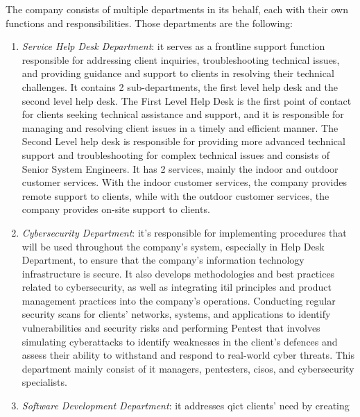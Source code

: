 \begin{multicols}{2}
      The company consists of multiple departments in its behalf, each with their own functions and responsibilities.
      Those departments are the following:
      \begin{enumerate}
            \item \textit{Service Help Desk Department}: it serves as a frontline support function responsible for
                  addressing client inquiries, troubleshooting technical issues, and providing guidance and support
                  to clients in resolving their technical challenges. It contains 2 sub-departments, the first level
                  help desk and the second level help desk. The First Level Help Desk is the first point of contact
                  for clients seeking technical assistance and support, and it is responsible for managing and
                  resolving client issues in a timely and efficient manner. The Second Level help desk is
                  responsible for providing more advanced technical support and troubleshooting for complex
                  technical issues and consists of Senior System Engineers. It has 2 services, mainly the indoor
                  and outdoor customer services. With the indoor customer services, the company provides remote
                  support to clients, while with the outdoor customer services, the company provides on-site
                  support to clients.
            \item \textit{Cybersecurity Department}: it's responsible for implementing procedures that will be used
                  throughout the company's system, especially in Help Desk Department, to ensure that the company's
                  information technology infrastructure is secure. It also develops methodologies and best practices
                  related to cybersecurity, as well as integrating \acrshort{itil} principles and product management
                  practices into the company's operations. Conducting regular security scans for clients' networks,
                  systems, and applications to identify vulnerabilities and security risks and performing
                  \gls{Pentest} that involves simulating cyberattacks to identify weaknesses in the client's
                  defences and assess their ability to withstand and respond to real-world cyber threats. This
                  department mainly consist of \acrshort{it} managers, \acrshort{pentest}ers, \acrshort{ciso}s,
                  and cybersecurity specialists.
            \item \textit{Software Development Department}: it addresses \acrshort{qict} clients' need by creating

\end{enumerate}
\end{multicols}
